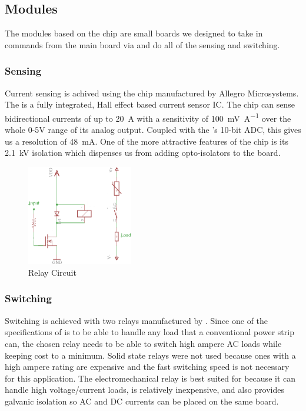 \subsection{\atmel Modules}
The modules based on the \atmega chip are small boards we designed to take in commands from the main \olimex board via \rsserial and do all of the sensing and switching.

\subsubsection{Sensing}
Current sensing is achived using the \allegro chip manufactured by Allegro Microsystems. The \allegro is a fully integrated, Hall effect based current sensor IC. The chip can sense bidirectional currents of up to \SI{20}{\ampere} with a sensitivity of \SI{100}{\milli\volt\per\ampere} over the whole 0-5V range of its analog output. Coupled with the \atmega 's 10-bit ADC, this gives us a resolution of \SI{48}{\milli\ampere}. One of the more attractive features of the \allegro chip is its \SI{2.1}{\kilo\volt} isolation which dispenses us from adding opto-isolators to the board.\\

\begin{figure}
\centering
\includegraphics[width=174px,viewport=0 0 348 331]{figures/relaycircuit.png}
\caption{Relay Circuit}
\label{fig:relaycircuit}
\end{figure}

\subsubsection{Switching}
Switching is achieved with two \relay relays manufactured by \relaymf. Since one of the specifications of \netlets is to be able to handle any load that a conventional power strip can, the chosen relay needs to be able to switch high ampere AC loads while keeping cost to a minimum. Solid state relays were not used because ones with a high ampere rating are expensive and the fast switching speed is not necessary for this application. The electromechanical relay is best suited for \netlets because it can handle high voltage/current loads, is relatively inexpensive, and also provides galvanic isolation so AC and DC currents can be placed on the same board. \\

